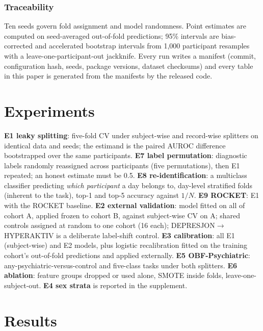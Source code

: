 \documentclass[journal]{IEEEtran}
\begin{document}
\subsubsection{Traceability} Ten seeds govern fold assignment and model randomness. Point estimates are computed on seed-averaged out-of-fold predictions; 95\% intervals are bias-corrected and accelerated bootstrap intervals from 1{,}000 participant resamples with a leave-one-participant-out jackknife. Every run writes a manifest (commit, configuration hash, seeds, package versions, dataset checksums) and every table in this paper is generated from the manifests by the released code.

\section{Experiments}\label{sec:exp}
\textbf{E1 leaky splitting}: five-fold CV under subject-wise and record-wise splitters on identical data and seeds; the estimand is the paired AUROC difference bootstrapped over the same participants. \textbf{E7 label permutation}: diagnostic labels randomly reassigned across participants (five permutations), then E1 repeated; an honest estimate must be 0.5. \textbf{E8 re-identification}: a multiclass classifier predicting \emph{which participant} a day belongs to, day-level stratified folds (inherent to the task), top-1 and top-5 accuracy against $1/N$. \textbf{E9 ROCKET}: E1 with the ROCKET baseline. \textbf{E2 external validation}: model fitted on all of cohort A, applied frozen to cohort B, against subject-wise CV on A; shared controls assigned at random to one cohort (16 each); DEPRESJON$\rightarrow$HYPERAKTIV is a deliberate label-shift control. \textbf{E3 calibration}: all E1 (subject-wise) and E2 models, plus logistic recalibration fitted on the training cohort's out-of-fold predictions and applied externally. \textbf{E5 OBF-Psychiatric}: any-psychiatric-versus-control and five-class tasks under both splitters. \textbf{E6 ablation}: feature groups dropped or used alone, SMOTE inside folds, leave-one-subject-out. \textbf{E4 sex strata} is reported in the supplement.

\section{Results}\label{sec:results}
\end{document}
